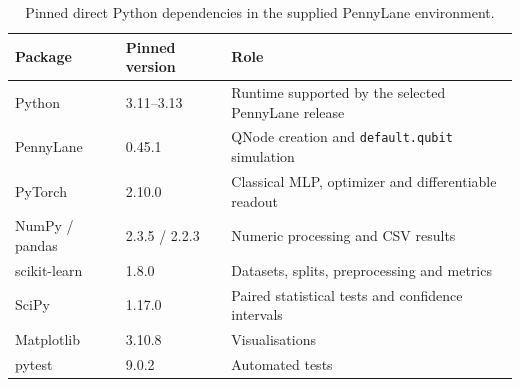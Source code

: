 \begin{table}[!htbp]
\centering\small
\caption{Pinned direct Python dependencies in the supplied PennyLane environment.}
\begin{tabularx}{\linewidth}{@{}l l X@{}}
\toprule
Package & Pinned version & Role\\
\midrule
Python & 3.11--3.13 & Runtime supported by the selected PennyLane release\\
PennyLane & 0.45.1 & QNode creation and \texttt{default.qubit} simulation\\
PyTorch & 2.10.0 & Classical MLP, optimizer and differentiable readout\\
NumPy / pandas & 2.3.5 / 2.2.3 & Numeric processing and CSV results\\
scikit-learn & 1.8.0 & Datasets, splits, preprocessing and metrics\\
SciPy & 1.17.0 & Paired statistical tests and confidence intervals\\
Matplotlib & 3.10.8 & Visualisations\\
pytest & 9.0.2 & Automated tests\\
\bottomrule
\end{tabularx}
\end{table}
